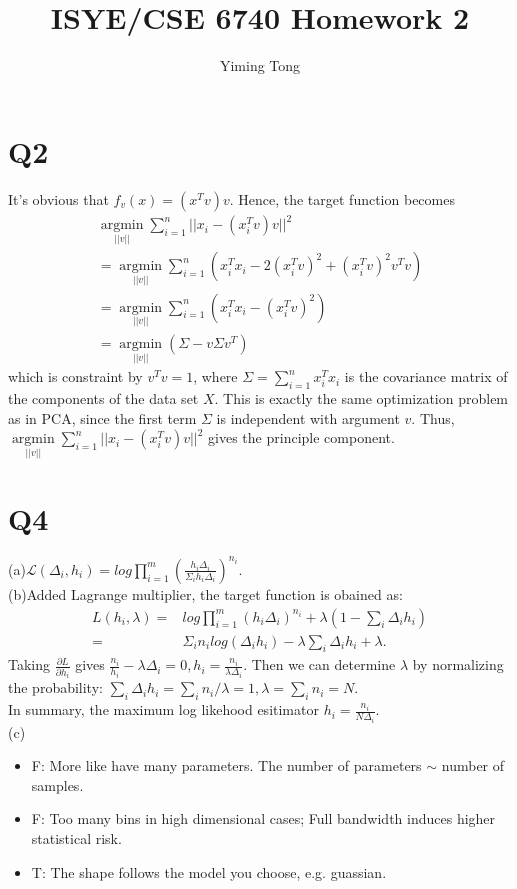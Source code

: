 \documentclass{article}
\title{ISYE/CSE 6740 Homework 2}
\author{Yiming Tong}
\begin{document}
\maketitle
\section{Q2}
It's obvious that $f_v(x)=(x^Tv)v$. Hence, the target function becomes
\begin{gather*}
\mathop{argmin}\limits_{||v||}\sum_{i=1}^n||x_i-(x_i^Tv)v||^2\\
=\mathop{argmin}\limits_{||v||}\sum_{i=1}^n(x_i^Tx_i-2(x_i^Tv)^2+(x_i^Tv)^2v^Tv)\\
=\mathop{argmin}\limits_{||v||}\sum_{i=1}^n(x_i^Tx_i-(x_i^Tv)^2)\\
=\mathop{argmin}\limits_{||v||}(\Sigma-v\Sigma v^T)
\end{gather*}
which is constraint by $v^Tv=1$, where $\Sigma=\sum_{i=1}^nx_i^Tx_i$ is the covariance matrix of the components of the data set $X$. This is exactly the same optimization problem as in PCA, since the first term $\Sigma$ is independent with argument $v$. Thus, $\mathop{argmin}\limits_{||v||}\sum_{i=1}^n||x_i-(x_i^Tv)v||^2$ gives the principle component.
\section{Q4}
(a)$\mathcal{L}(\Delta_i, h_i)=log\prod_{i=1}^m(\frac{h_i\Delta_i}{\Sigma_ih_i\Delta_i})^{n_i}$.\\
(b)Added Lagrange multiplier, the target function is obained as:
\begin{align*}
L(h_i, \lambda)=&log\prod_{i=1}^m(h_i\Delta_i)^{n_i}+\lambda(1-\sum_i\Delta_ih_i)\\
=&\Sigma_in_ilog(\Delta_ih_i)-\lambda\sum_i\Delta_ih_i+\lambda.
\end{align*}
Taking $\frac{\partial L}{\partial h_i}$ gives $\frac{n_i}{h_i}-\lambda\Delta_i=0, h_i=\frac{n_i}{\lambda\Delta_i}.$ Then we can determine $\lambda$ by normalizing the probability: $\sum_i\Delta_ih_i=\sum_in_i/\lambda=1, \lambda = \sum_in_i=N$. \\
In summary, the maximum log likehood esitimator $h_i = \frac{n_i}{N\Delta_i}$.\\
(c)
\begin{itemize}
\item F: More like have many parameters. The number of parameters $\sim$ number of samples.
\item F: Too many bins in high dimensional cases; Full bandwidth induces higher statistical risk. 
\item T: The shape follows the model you choose, e.g. guassian.
\end{itemize}
\end{document}
